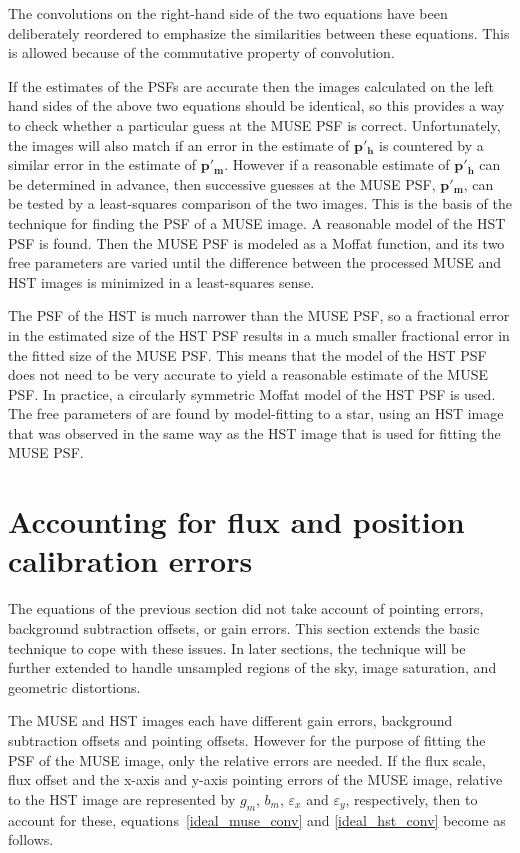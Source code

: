 \documentclass[12pt,twoside,a4paper]{article}
\newcommand{\mepsf}{\mathbf{p'_m}}
\newcommand{\hepsf}{\mathbf{p'_h}}
\newcommand{\dx}{\varepsilon_x}
\newcommand{\dy}{\varepsilon_y}
\newcommand{\mgain}{g_m}
\newcommand{\mbg}{b_m}
\begin{document}
The convolutions on the right-hand side of the two equations have
been deliberately reordered to emphasize the similarities between
these equations. This is allowed because of the commutative property
of convolution.

If the estimates of the PSFs are accurate then the images calculated
on the left hand sides of the above two equations should be identical,
so this provides a way to check whether a particular guess at the MUSE
PSF is correct.  Unfortunately, the images will also match if an error
in the estimate of $\hepsf$ is countered by a similar error in the
estimate of $\mepsf$. However if a reasonable estimate of $\hepsf$ can
be determined in advance, then successive guesses at the MUSE PSF,
$\mepsf$, can be tested by a least-squares comparison of the two
images. This is the basis of the technique for finding the PSF of a
MUSE image. A reasonable model of the HST PSF is found. Then the MUSE
PSF is modeled as a Moffat function, and its two free parameters are
varied until the difference between the processed MUSE and HST images
is minimized in a least-squares sense.

The PSF of the HST is much narrower than the MUSE PSF, so a fractional
error in the estimated size of the HST PSF results in a much smaller
fractional error in the fitted size of the MUSE PSF. This means that
the model of the HST PSF does not need to be very accurate to yield a
reasonable estimate of the MUSE PSF. In practice, a circularly
symmetric Moffat model of the HST PSF is used. The free parameters of
are found by model-fitting to a star, using an HST image that was
observed in the same way as the HST image that is used for fitting the
MUSE PSF.

\section{Accounting for flux and position calibration errors}

The equations of the previous section did not take account of pointing
errors, background subtraction offsets, or gain errors. This section
extends the basic technique to cope with these issues. In later
sections, the technique will be further extended to handle unsampled
regions of the sky, image saturation, and geometric distortions.

The MUSE and HST images each have different gain errors, background
subtraction offsets and pointing offsets. However for the purpose of
fitting the PSF of the MUSE image, only the relative errors are
needed. If the flux scale, flux offset and the x-axis and y-axis
pointing errors of the MUSE image, relative to the HST image are
represented by $\mgain$, $\mbg$, $\dx$ and $\dy$, respectively, then
to account for these, equations~\ref{ideal_muse_conv} and
\ref{ideal_hst_conv} become as follows.
\end{document}
